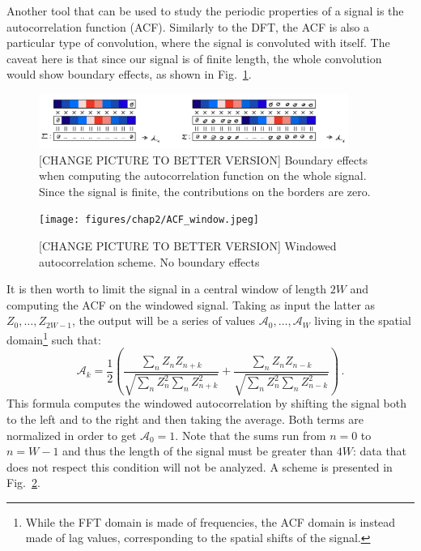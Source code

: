 Another tool that can be used to study the periodic properties of a signal is the autocorrelation function (ACF). Similarly to the DFT, the ACF is also a particular type of convolution, where the signal is convoluted with itself. The caveat here is that since our signal is of finite length, the whole convolution would show boundary effects, as shown in Fig.\ \ref{fig:ACF_bound}.
\begin{figure}[h!]
    \centering
    \includegraphics[width=0.9\textwidth]{figures/chap2/ACF_bound.jpeg}
    \caption{[CHANGE PICTURE TO BETTER VERSION] Boundary effects when computing the autocorrelation function on the whole signal. Since the signal is finite, the contributions on the borders are zero.}
    \label{fig:ACF_bound}
\end{figure}
\begin{figure}[h!]
    \centering
    \texttt{[image: figures/chap2/ACF\_window.jpeg]}
    \caption{[CHANGE PICTURE TO BETTER VERSION] Windowed autocorrelation scheme. No boundary effects}
    \label{fig:ACF_window}
\end{figure}
It is then worth to limit the signal in a central window of length $2W$ and computing the ACF on the windowed signal. Taking as input the latter as $Z_0,\dots,Z_{2W-1}$, the output will be a series of values $\mathcal{A}_0,\dots,\mathcal{A}_{W}$ living in the spatial domain\footnote{While the FFT domain is made of frequencies, the ACF domain is instead made of lag values, corresponding to the spatial shifts of the signal.} such that:
\begin{equation*}
    \mathcal{A}_k = \frac{1}{2} \left( \frac{\sum_{n} Z_n Z_{n+k}}{\sqrt{\sum_{n} Z_n^2 \sum_{n} Z_{n+k}^2}} + \frac{\sum_{n} Z_n Z_{n-k}}{\sqrt{\sum_{n} Z_n^2 \sum_{n} Z_{n-k}^2}} \right)\, .
\end{equation*}
This formula computes the windowed autocorrelation by shifting the signal both to the left and to the right and then taking the average.
Both terms are normalized in order to get $\mathcal{A}_0 = 1$. Note that the sums run from $n = 0$ to $n = W-1$ and thus the length of the signal must be greater than $4W$: data that does not respect this condition will not be analyzed. A scheme is presented in Fig.\ \ref{fig:ACF_window}.

